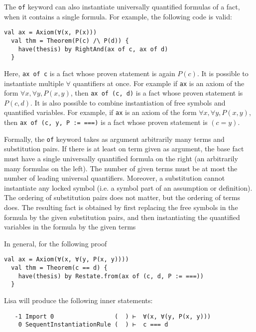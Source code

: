 The \lstinline|of| keyword can also instantiate universally quantified formulas of a fact, when it contains a single formula. For example, the following code is valid:
\begin{lstlisting}[language=lisa, frame=single]
  val ax = Axiom(∀(x, P(x)))
  val thm = Theorem(P(c) /\ P(d)) {
    have(thesis) by RightAnd(ax of c, ax of d)
  }
\end{lstlisting}
Here, \lstinline|ax of c| is a fact whose proven statement is again $P(c)$. It is possible to instantiate multiple $\forall$ quantifiers at once. For example if \lstinline|ax| is an axiom of the form $\forall x, \forall y, P(x, y)$, then \lstinline|ax of (c, d)| is a fact whose proven statement is $P(c, d)$. It is also possible to combine instantiation of free symbols and quantified variables. For example, if \lstinline|ax| is an axiom of the form $\forall x, \forall y, P(x, y)$, then \lstinline|ax of (c, y, P := ===)| is a fact whose proven statement is $(c = y)$.

Formally, the \lstinline|of| keyword takes as argument arbitrarily many terms and substitution pairs. If there is at least on term given as argument, the base fact must have a single universally quantified formula on the right (an arbitrarily many formulas on the left). The number of given terms must be at most the number of leading universal quantifiers. Moreover, a substitution cannot instantiate any locked symbol (i.e. a symbol part of an assumption or definition). The ordering of substitution pairs does not matter, but the ordering of terms does. The resulting fact is obtained by first replacing the free symbols in the formula by the given substitution pairs, and then instantiating the quantified variables in the formula by the given terms

In general, for the following proof
\begin{lstlisting}[language=lisa, frame=single]
  val ax = Axiom(∀(x, ∀(y, P(x, y))))
  val thm = Theorem(c == d) {
    have(thesis) by Restate.from(ax of (c, d, P := ===))
  }
\end{lstlisting}
Lisa will produce the following inner statements:
\begin{lstlisting}
   -1 Import 0                 (  ) ⊢  ∀(x, ∀(y, P(x, y)))
    0 SequentInstantiationRule (  ) ⊢  c === d
\end{lstlisting}

